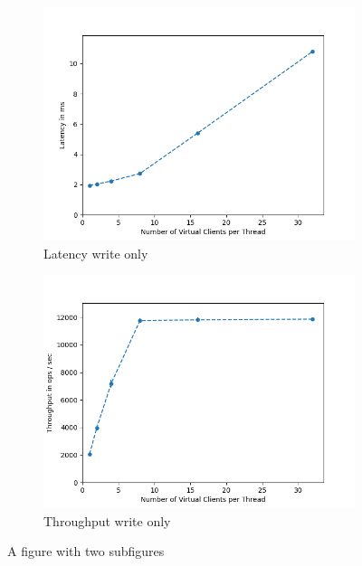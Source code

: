 \documentclass[11pt,a4paper]{article}
\begin{document}
\begin{figure}[H]
\centering
\begin{subfigure}{.5\textwidth}
    \centering
    \includegraphics[width=\textwidth]{img/exp2_2/exp2_2__latency_write_1.png}
    \caption{Latency write only}
    \label{fig:mesh1}
\end{subfigure}%
\begin{subfigure}{.5\textwidth}
      \centering
    \includegraphics[width=\textwidth]{img/exp2_2/exp2_2__throughput_write_1.png}
    \caption{Throughput write only}
    \label{fig:mesh1}
\end{subfigure}
\caption{A figure with two subfigures}
\label{fig:test}
\end{figure}
\end{document}
